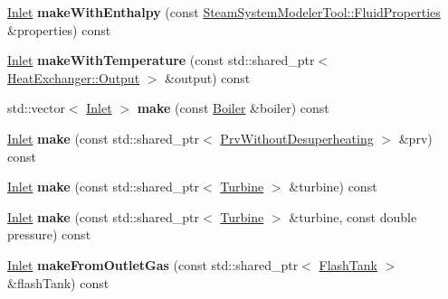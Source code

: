 \begin{DoxyCompactItemize}
\item 
\mbox{\label{class_inlet_factory_a9bc3a8b4a15f7a486b8c64b757c23f6e}} 
\hyperlink{class_inlet}{Inlet} {\bfseries make\+With\+Enthalpy} (const \hyperlink{struct_steam_system_modeler_tool_1_1_fluid_properties}{Steam\+System\+Modeler\+Tool\+::\+Fluid\+Properties} \&properties) const
\item 
\mbox{\label{class_inlet_factory_a8d71dcd9f0e2b4df202542281659732d}} 
\hyperlink{class_inlet}{Inlet} {\bfseries make\+With\+Temperature} (const std\+::shared\+\_\+ptr$<$ \hyperlink{struct_heat_exchanger_1_1_output}{Heat\+Exchanger\+::\+Output} $>$ \&output) const
\item 
\mbox{\label{class_inlet_factory_a770ec16a96976e7f808d8800bafbdf1b}} 
std\+::vector$<$ \hyperlink{class_inlet}{Inlet} $>$ {\bfseries make} (const \hyperlink{class_boiler}{Boiler} \&boiler) const
\item 
\mbox{\label{class_inlet_factory_abbb5f2f2644b1ad68a82571cab075947}} 
\hyperlink{class_inlet}{Inlet} {\bfseries make} (const std\+::shared\+\_\+ptr$<$ \hyperlink{class_prv_without_desuperheating}{Prv\+Without\+Desuperheating} $>$ \&prv) const
\item 
\mbox{\label{class_inlet_factory_a6642da76a5322ce70d55910075ff7de3}} 
\hyperlink{class_inlet}{Inlet} {\bfseries make} (const std\+::shared\+\_\+ptr$<$ \hyperlink{class_turbine}{Turbine} $>$ \&turbine) const
\item 
\mbox{\label{class_inlet_factory_a93287e435c4d429db96149c5e7591261}} 
\hyperlink{class_inlet}{Inlet} {\bfseries make} (const std\+::shared\+\_\+ptr$<$ \hyperlink{class_turbine}{Turbine} $>$ \&turbine, const double pressure) const
\item 
\mbox{\label{class_inlet_factory_a1c2ae68473be66b8636b420adb54ca94}} 
\hyperlink{class_inlet}{Inlet} {\bfseries make\+From\+Outlet\+Gas} (const std\+::shared\+\_\+ptr$<$ \hyperlink{class_flash_tank}{Flash\+Tank} $>$ \&flash\+Tank) const
\item 
\mbox{\label{class_inlet_factory_a74829dbddf317d0510bd4fceb408853e}} 

\end{DoxyCompactItemize}
